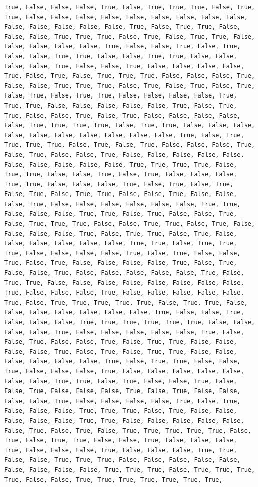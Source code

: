 \documentclass[
  letterpaper,
  DIV=11,
  numbers=noendperiod]{scrartcl}
\begin{document}
\begin{verbatim}
True, False, False, False, True, False, True, True, True, False, True, True, False, False, False, False, False, False, False, False, False, False, False, False, False, False, True, False, True, True, False, False, False, True, True, True, False, True, False, True, True, False, False, False, False, False, True, False, False, True, False, True, False, False, True, True, False, False, True, True, False, False, False, False, True, False, False, True, False, False, False, False, True, False, True, False, True, True, True, False, False, False, True, False, False, True, True, True, False, True, False, True, False, True, False, True, False, True, True, False, False, False, False, True, True, True, False, False, False, False, False, True, False, True, True, False, False, True, False, True, False, False, False, False, False, True, True, True, True, False, True, True, False, False, False, False, False, False, False, False, False, False, True, False, True, True, True, True, False, True, False, True, False, False, False, True, False, True, False, False, True, False, False, False, False, False, False, False, False, False, False, True, True, True, True, False, True, True, False, False, True, False, True, False, False, False, True, True, False, False, False, True, False, True, False, True, False, True, False, True, True, False, False, True, False, False, False, True, False, False, False, False, False, False, True, True, False, False, False, True, True, False, True, False, False, True, False, True, True, True, False, False, True, True, False, True, False, False, False, False, True, False, True, True, False, True, False, False, False, False, False, False, True, True, False, True, True, True, False, False, False, False, True, False, True, False, False, True, False, True, False, False, False, False, True, False, True, False, False, True, False, False, False, False, False, True, False, True, True, False, False, False, False, False, False, False, False, True, False, False, False, True, False, False, False, False, False, True, False, True, True, True, True, True, False, True, True, False, False, False, False, False, False, False, True, False, False, True, False, False, False, True, True, True, True, True, True, False, False, False, False, True, False, False, False, False, False, True, False, False, True, False, False, True, False, True, True, False, False, False, False, True, False, True, False, True, True, False, False, False, False, False, False, True, False, True, True, False, False, True, False, False, False, True, False, False, False, False, False, False, False, True, True, False, True, False, False, True, False, False, True, False, False, False, True, False, True, False, False, False, False, True, False, False, False, False, True, False, True, False, False, False, True, True, True, False, True, False, False, False, False, False, True, True, False, False, False, False, False, False, True, False, True, False, True, True, True, True, True, False, True, False, True, True, False, False, True, False, False, False, True, False, False, False, True, False, False, False, True, True, False, False, True, True, True, False, False, False, False, False, False, False, False, False, True, True, True, False, True, True, True, True, False, False, True, True, True, True, True, True, True, 
\end{verbatim}
\end{document}
